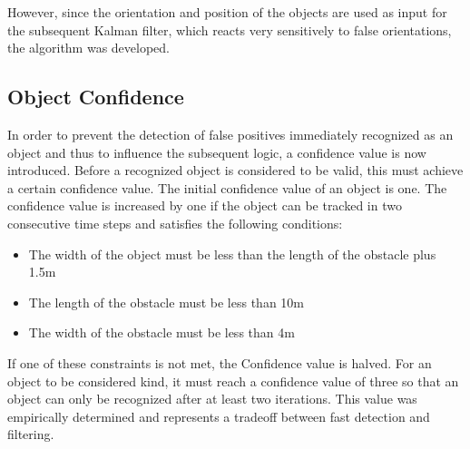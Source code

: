 \documentclass[11pt,oneside,openright]{mpreport}
\begin{document}
However, since the orientation and position of the objects are used as input for the subsequent Kalman filter, which reacts very sensitively to false orientations, the algorithm was developed.

\subsection{Object Confidence}

In order to prevent the detection of false positives immediately recognized as an object and thus to influence the subsequent logic, a confidence value is now introduced. 
Before a recognized object is considered to be valid, this must achieve a certain confidence value. The initial confidence value of an object is one. 
The confidence value is increased by one if the object can be tracked in two consecutive time steps and satisfies the following conditions:

\begin{itemize}
\item The width of the object must be less than the length of the obstacle plus 1.5m
\item The length of the obstacle must be less than 10m
\item The width of the obstacle must be less than 4m
\end{itemize}
If one of these constraints is not met, the Confidence value is halved. For an object to be considered kind, it must reach a confidence value of three so that an object can only be 
recognized after at least two iterations. This value was empirically determined and represents a tradeoff between fast detection and filtering.
\end{document}
